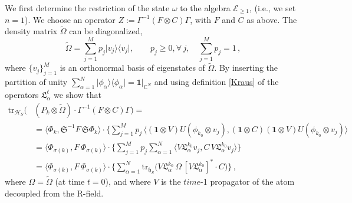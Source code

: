 \documentclass[12pt]{article}
\begin{document}
 We first determine the restriction of the state $\omega$ to the algebra $\mathcal{E}_{\geq 1}$, (i.e., we set $n=1$). We choose an operator
 $Z:=\Gamma^{-1} (F\otimes C)\Gamma$, with $F$ and $C$ as above. The density matrix $\widetilde{\Omega}$ can be diagonalized,
 $$\widetilde{\Omega}= \sum_{j=1}^{M} p_j \vert v_j\rangle \langle v_j\vert, \qquad p_j \geq 0, \forall\, j, \quad
 \sum_{j=1}^{M}p_j =1\,,$$
 where $\big\{v_j \big\}_{j=1}^{M}$ is an orthonormal basis of eigenstates of $\widetilde{\Omega}$.
 By inserting the partition of unity $\sum_{\alpha=1}^{N} \vert \phi_{\alpha} \rangle \langle \phi_{\alpha}\vert = \mathbf{1}\vert_{\mathbb{C}^{N}}$ and using definition \eqref{Kraus} of the operators $\mathfrak{L}_{\alpha}^{\ell}$ we show that
 \begin{align}\label{one step}
 \text{tr}_{\mathcal{H}_S}\big(&(P_{{k}}\otimes \widetilde{\Omega})\cdot \Gamma^{-1}(F\otimes C)\Gamma\big) = \nonumber\\
& = \langle \Phi_{{k}}, \mathfrak{S}^{-1} F\, \mathfrak{S} \Phi_{{k}}\rangle \cdot \Big\{\sum_{j=1}^{M} p_{j}\,
\langle (\mathbf{1}\otimes V)U(\phi_{k_0}\otimes v_j), (\mathbf{1}\otimes C) (\mathbf{1}\otimes V) U(\phi_{k_0} \otimes v_j )\rangle\, \nonumber \\
& =\langle \Phi_{\sigma({k})}, F\,  \Phi_{\sigma({k})}\rangle \cdot \Big\{\sum_{j=1}^{M} p_{j} \sum_{\alpha=1}^{N} \langle V\mathfrak{L}_{\alpha}^{k_0} v_j, C\, V\mathfrak{L}_{\alpha}^{k_0} v_j \rangle\Big\} \nonumber \\
& = \langle \Phi_{\sigma({k})}, F\,  \Phi_{\sigma({k})}\rangle \cdot \Big\{\sum_{\alpha=1}^{N}
\text{tr}_{\mathfrak{h}_S} \big(V\mathfrak{L}_{\alpha}^{k_0}\, \Omega\, [V\mathfrak{L}_{\alpha}^{k_0} ]^{*} \cdot C\big)\Big\}\,,
\end{align}
where $\Omega = \widetilde{\Omega}$ (at time $t=0$), and where $V$ is the $time$-1 propagator of the atom decoupled
from the R-field.
\end{document}
